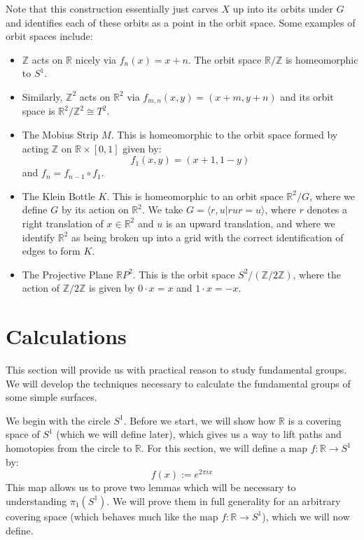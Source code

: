 \documentclass[11pt, oneside]{amsart}   	%
\theoremstyle{definition}
\begin{document}
	Note that this construction essentially just carves $X$ up into its orbits under $G$ and identifies each of these orbits as a point in the orbit space. Some 
	examples of orbit spaces include:
	\begin{itemize}
		\item $\mathbb Z$ acts on $\mathbb R$ nicely via $f_n(x) = x + n$. The orbit space $\mathbb R / \mathbb Z$ is homeomorphic to $S^1$.
		
		\item Similarly, $\mathbb Z^2$ acts on $\mathbb R^2$ via $f_{m, n}(x, y) = (x + m, y + n)$ and its orbit space is $\mathbb R^2 / \mathbb Z^2\cong 
		T^2$.
		
		\item The Mobius Strip $M$. This is homeomorphic to the orbit space formed by acting $\mathbb Z$ on $\mathbb R\times [0, 1]$ given by:
		$$
			f_1(x, y) = (x + 1, 1 - y)
		$$
		and $f_n = f_{n - 1}\circ f_1$. 
		
		\item The Klein Bottle $K$. This is homeomorphic to an orbit space $\mathbb R^2 / G$, where we define $G$ by its action on $\mathbb R^2$. We take 
		$G = \langle r, u | rur = u\rangle$, where $r$ denotes a right translation of $x\in\mathbb R^2$ and $u$ is an upward translation, and where we identify 
		$\mathbb R^2$ as being broken up into a grid with the correct identification of edges to form $K$. 
		
		\item The Projective Plane $\mathbb RP^2$. This is the orbit space $S^2 / (\mathbb Z / 2\mathbb Z)$, where the action of $\mathbb Z / 2\mathbb Z$ is 
		given by $0\cdot x = x$ and $1\cdot x = -x$. 
	\end{itemize}

\section{Calculations}

	This section will provide us with practical reason to study fundamental groups. We will develop the techniques necessary to calculate the fundamental groups 
	of some simple surfaces. 

	We begin with the circle $S^1$. Before we start, we will show how $\mathbb R$ is a covering space of $S^1$ (which we will define later), which gives us a way 
	to lift paths and homotopies from the circle to $\mathbb R$. For this section, we will define a map $f : \mathbb R\rightarrow S^1$ by:
	$$
		f(x) := e^{2\pi i x}
	$$
	This map allows us to prove two lemmas which will be necessary to understanding $\pi_1(S^1)$. We will prove them in full generality for an arbitrary 
	covering space (which behaves much like the map $f : \mathbb R\rightarrow S^1$), which we will now define.
	
\end{document}
